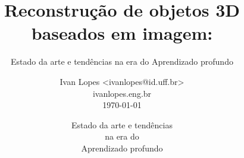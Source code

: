 \title[]
{
Reconstrução de objetos 3D baseados em imagem:
}

\subtitle{Estado da arte e tendências na era do  Aprendizado profundo}


\author[Ivan]{Ivan Lopes <ivanlopes@id.uff.br>\\
              ivanlopes.eng.br\\
\today}

\date[2019] %
{ Estado da arte e tendências\\
  na era do \\
  Aprendizado profundo }

